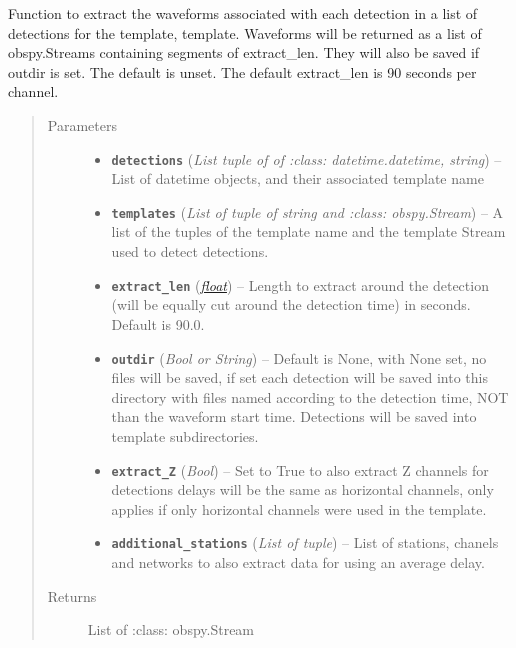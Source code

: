 \documentclass[a4paper,10pt,english]{sphinxmanual}
\begin{document}
\begin{fulllineitems}
\label{utils:clustering.extract_detections}
Function to extract the waveforms associated with each detection in a list
of detections for the template, template.  Waveforms will be returned as
a list of obspy.Streams containing segments of extract\_len.  They will also
be saved if outdir is set.  The default is unset.  The default extract\_len
is 90 seconds per channel.
\begin{quote}\begin{description}
\item[{Parameters}] \leavevmode\begin{itemize}
\item {} 
\textbf{\texttt{detections}} (\emph{List tuple of of :class: datetime.datetime, string}) -- List of datetime objects, and their associated template            name

\item {} 
\textbf{\texttt{templates}} (\emph{List of tuple of string and :class: obspy.Stream}) -- A list of the tuples of the template name and the template            Stream used to detect detections.

\item {} 
\textbf{\texttt{extract\_len}} (\href{https://docs.python.org/library/functions.html\#float}{\emph{float}}) -- Length to extract around the detection (will be equally            cut around the detection time) in seconds.  Default is 90.0.

\item {} 
\textbf{\texttt{outdir}} (\emph{Bool or String}) -- Default is None, with None set, no files will be saved,            if set each detection will be saved into this directory with files            named according to the detection time, NOT than the waveform            start time. Detections will be saved into template subdirectories.

\item {} 
\textbf{\texttt{extract\_Z}} (\emph{Bool}) -- Set to True to also extract Z channels for detections            delays will be the same as horizontal channels, only applies if            only horizontal channels were used in the template.

\item {} 
\textbf{\texttt{additional\_stations}} (\emph{List of tuple}) -- List of stations, chanels and networks to also            extract data for using an average delay.

\end{itemize}

\item[{Returns}] \leavevmode
List of :class: obspy.Stream

\end{description}\end{quote}

\end{fulllineitems}
\end{document}
